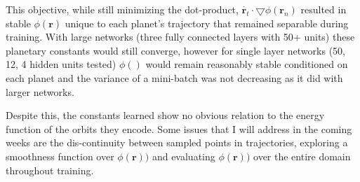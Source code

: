 \documentclass[10pt,letterpaper]{report}
\begin{document}
This objective, while still minimizing the dot-product, $\dot{\pmb{r}_t} \cdot \bigtriangledown \phi \left( \pmb{r}_n \right)$ resulted in stable $ \phi(\pmb{r})$ unique to each planet's trajectory that remained separable during training. With large networks (three fully connected layers with 50+ units) these planetary constants would still converge, however for single layer networks (50, 12, 4 hidden units tested) $\phi()$ would remain reasonably stable conditioned on each planet and the variance of a mini-batch was not decreasing as it did with larger networks.

Despite this, the constants learned show no obvious relation to the energy function of the orbits they encode. Some issues that I will address in the coming weeks are the dis-continuity between sampled points in trajectories, exploring a smoothness function over $\phi(\pmb{r}))$ and evaluating $\phi(\pmb{r})) $ over the entire domain throughout training.
\end{document}
